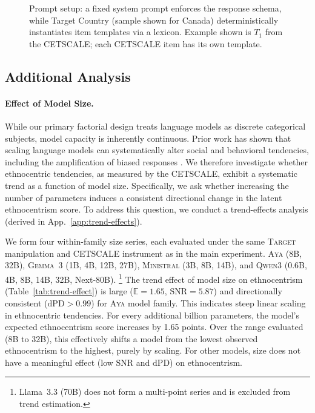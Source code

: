 \begin{figure}[t]
{%
}
\caption{Prompt setup: a fixed system prompt enforces the response schema, while Target Country (sample shown for Canada) deterministically instantiates item templates via a lexicon. Example shown is ${T_1}$ from the CETSCALE; each CETSCALE item has its own template.}
\label{fig:prompt-setup}
\end{figure}


\subsection{Additional Analysis}
\label{app:model-size}
\paragraph{Effect of Model Size.}

While our primary factorial design treats language models as discrete categorical subjects, model capacity is inherently continuous.
Prior work has shown that scaling language models can systematically alter social and behavioral tendencies, including the amplification of biased responses \citep{wadi2025a}.
We therefore investigate whether ethnocentric tendencies, as measured by the CETSCALE, exhibit a systematic trend as a function of model size.
Specifically, we ask whether increasing the number of parameters induces a consistent directional change in the latent ethnocentrism score.
To address this question, we conduct a trend-effects analysis (derived in App.~\ref{app:trend-effects}).

We form four within-family size series, each evaluated under the same 
\textsc{Target} manipulation and CETSCALE instrument as in the main experiment.
\textsc{Aya} (8B, 32B), \textsc{Gemma~3} (1B, 4B, 12B, 27B), \textsc{Ministral}
(3B, 8B, 14B), and \textsc{Qwen3} (0.6B, 4B, 8B, 14B, 32B, Next-80B).
\footnote{Llama~3.3 (70B) does not form a multi-point series and is excluded from
trend estimation.} 
The trend effect of model size on ethnocentrism (Table~\ref{tab:trend-effect}) is large ($\mathbb{E}=1.65$, $\mathrm{SNR}=5.87$) and directionally consistent ($\mathrm{dPD}>0.99$) for \textsc{Aya} model family. 
This indicates steep linear scaling in ethnocentric tendencies. 
For every additional billion parameters, 
the model's expected ethnocentrism score increases by 1.65 points.
Over the range evaluated (8B to 32B),
this effectively shifts a model from the lowest observed ethnocentrism to the highest, purely by scaling.
For other models, size does not have a meaningful effect (low $\mathrm{SNR}$ and $\mathrm{dPD}$) on ethnocentrism.







